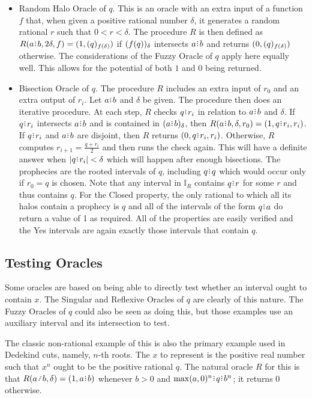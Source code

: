 \documentclass[12pt]{article}
\begin{document}
\begin{itemize}
    \item Random Halo Oracle of $q$. This is an oracle with an extra input of a function $f$ that, when given a positive rational number $\delta$, it generates a random rational $r$ such that $0 < r < \delta$. The procedure $R$ is then defined as $R(a\rint b, 2\delta, f) = (1, \halo[f(\delta)]{q})$ if $\halo{f(q)}$ intersects $a\rint b$ and returns $(0, \halo[f(\delta)]{q})$ otherwise. The considerations of the Fuzzy Oracle of $q$ apply here equally well. This allows for the potential of both $1$ and $0$ being returned. 
    
    \item Bisection Oracle of $q$. The procedure $R$ includes an extra input of $r_0$ and an extra output of $r_i$. Let $a \rint b$ and $\delta$ be given. The procedure then does an iterative procedure.  At each step, $R$ checks $q \rint r_i$ in relation to $a \rint b$ and $\delta$. If $q \rint r_i$ intersects $a \rint b$ and is contained in $\halo{a \rint b}$, then $R(a \rint b, \delta, r_0) = (1, q \rint r_i, r_i)$. If $q \rint r_i$ and $a \rint b$ are disjoint, then $R$ returns $(0, q \rint r_i, r_i)$. Otherwise, $R$ computes $r_{i+1} = \frac{q + r_i}{2}$ and then runs the check again. This will have a definite answer when $|q \rint r_i| < \delta$ which will happen after enough bisections. The prophecies are the rooted intervals of $q$, including $q \rint q$ which would occur only if $r_0 = q$ is chosen. Note that any interval in $\mathbb{I}_R$ contains $q \rint r$ for some $r$ and thus contains $q$. For the Closed property, the only rational to which all its halos contain a prophecy is $q$ and all of the intervals of the form $q \rint a$ do return a value of 1 as required. All of the properties are easily verified and the Yes intervals are again exactly those intervals that contain $q$.
\end{itemize}

\subsection{Testing Oracles}

Some oracles are based on being able to directly test whether an interval ought to contain $x$. The Singular and Reflexive Oracles of $q$ are clearly of this nature. The Fuzzy Oracles of $q$ could also be seen as doing this, but those examples use an auxiliary interval and its intersection to test. 

The classic non-rational example of this is also the primary example used in Dedekind cuts, namely, $n$-th roots. The $x$ to represent is the positive real number such that $x^n$ ought to be the positive rational $q$. The natural oracle $R$ for this is that $R(a\lte b, \delta) = (1, a\rint b)$ whenever $b > 0$ and $\max(a, 0)^n\rint q\rint b^n$; it returns $0$ otherwise. 
\end{document}
